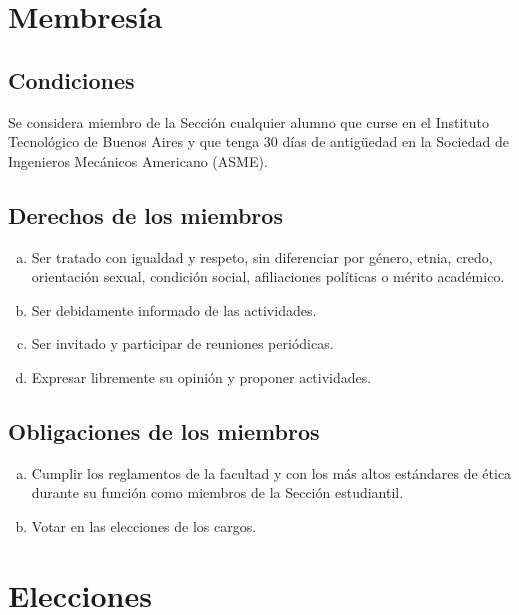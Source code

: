 \documentclass[12pt]{article}
\begin{document}
\section{Membresía}

\subsection{Condiciones} 
Se considera miembro de la Sección cualquier alumno que curse en el Instituto Tecnológico de Buenos Aires y que tenga 30 días de antigüedad en la Sociedad de Ingenieros Mecánicos Americano (ASME). 

\subsection{Derechos de los miembros}
\begin{enumerate}[a)]
\item Ser tratado con igualdad y respeto, sin diferenciar por género, etnia, credo, orientación sexual, condición social, afiliaciones políticas o mérito académico.
\item Ser debidamente informado de las actividades.
\item Ser invitado y participar de reuniones periódicas.
\item Expresar libremente su opinión y proponer actividades.
\end{enumerate}

\subsection{Obligaciones de los miembros}
\begin{enumerate}[a)]
\item Cumplir los reglamentos de la facultad y con los más altos estándares de ética durante su función como miembros de la Sección estudiantil.
\item Votar en las elecciones de los cargos.

\end{enumerate}

\section{Elecciones}
\end{document}
